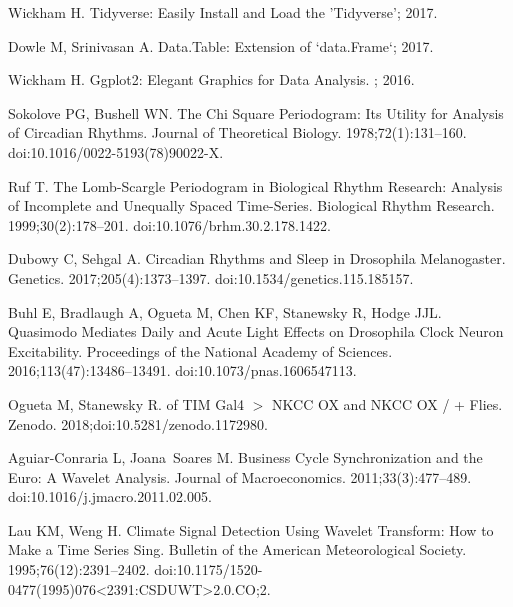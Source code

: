 \documentclass[10pt,letterpaper]{article}\usepackage[]{graphicx}\usepackage[]{color}
\begin{document}
\begin{thebibliography}{10}
	Wickham H.
	\newblock Tidyverse: {{Easily Install}} and {{Load}} the '{{Tidyverse}}'; 2017.
	
	Dowle M, Srinivasan A.
	\newblock Data.Table: {{Extension}} of `data.Frame`; 2017.
	
	Wickham H.
	\newblock Ggplot2: {{Elegant Graphics}} for {{Data Analysis}}.
	; 2016.
	
	Sokolove PG, Bushell WN.
	\newblock The Chi Square Periodogram: {{Its}} Utility for Analysis of Circadian
	Rhythms.
	\newblock Journal of Theoretical Biology. 1978;72(1):131--160.
	\newblock doi:{10.1016/0022-5193(78)90022-X}.
	
	Ruf T.
	\newblock The {{Lomb}}-{{Scargle Periodogram}} in {{Biological Rhythm
			Research}}: {{Analysis}} of {{Incomplete}} and {{Unequally Spaced
			Time}}-{{Series}}.
	\newblock Biological Rhythm Research. 1999;30(2):178--201.
	\newblock doi:{10.1076/brhm.30.2.178.1422}.
	
	Dubowy C, Sehgal A.
	\newblock Circadian {{Rhythms}} and {{Sleep}} in {{Drosophila}} Melanogaster.
	\newblock Genetics. 2017;205(4):1373--1397.
	\newblock doi:{10.1534/genetics.115.185157}.
	
	Buhl E, Bradlaugh A, Ogueta M, Chen KF, Stanewsky R, Hodge JJL.
	\newblock Quasimodo Mediates Daily and Acute Light Effects on {{Drosophila}}
	Clock Neuron Excitability.
	\newblock Proceedings of the National Academy of Sciences.
	2016;113(47):13486--13491.
	\newblock doi:{10.1073/pnas.1606547113}.
	
	Ogueta M, Stanewsky R.
	 of {{TIM Gal4}} $>$ {{NKCC OX}} and {{NKCC OX}} / +
	Flies.
	\newblock Zenodo. 2018;doi:{10.5281/zenodo.1172980}.
	
	Aguiar-Conraria L, Joana~Soares M.
	\newblock Business Cycle Synchronization and the {{Euro}}: {{A}} Wavelet
	Analysis.
	\newblock Journal of Macroeconomics. 2011;33(3):477--489.
	\newblock doi:{10.1016/j.jmacro.2011.02.005}.
	
	Lau KM, Weng H.
	\newblock Climate {{Signal Detection Using Wavelet Transform}}: {{How}} to
	{{Make}} a {{Time Series Sing}}.
	\newblock Bulletin of the American Meteorological Society.
	1995;76(12):2391--2402.
	\newblock doi:{10.1175/1520-0477(1995)076<2391:CSDUWT>2.0.CO;2}.
	

\end{thebibliography}
\end{document}
